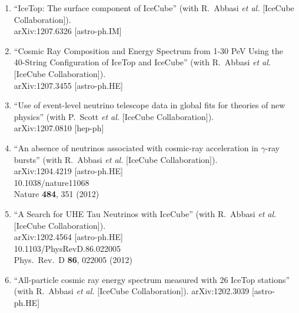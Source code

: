 \begin{enumerate}


\item ``IceTop: The surface component of IceCube'' (with R.~Abbasi {\it et
  al.}  [IceCube Collaboration]).  \\{}arXiv:1207.6326 [astro-ph.IM]
  


\item ``Cosmic Ray Composition and Energy Spectrum from 1-30 PeV Using the
  40-String Configuration of IceTop and IceCube'' (with R.~Abbasi {\it
    et al.}  [IceCube Collaboration]).  \\{}arXiv:1207.3455
  [astro-ph.HE]
  


\item ``Use of event-level neutrino telescope data in global fits for
  theories of new physics'' (with P.~Scott {\it et al.}  [IceCube
    Collaboration]).  \\{}arXiv:1207.0810 [hep-ph]
  


\item ``An absence of neutrinos associated with cosmic-ray acceleration in
  $\gamma$-ray bursts'' (with R.~Abbasi {\it et al.}  [IceCube
  Collaboration]).  \\{}arXiv:1204.4219 [astro-ph.HE]
  \\{}10.1038/nature11068 \\{}Nature {\bf 484}, 351 (2012) %


\item ``A Search for UHE Tau Neutrinos with IceCube'' (with R.~Abbasi {\it et
  al.}  [IceCube Collaboration]).  \\{}arXiv:1202.4564 [astro-ph.HE]
  \\{}10.1103/PhysRevD.86.022005 \\{}Phys.\ Rev.\ D {\bf 86}, 022005
  (2012) %


\item ``All-particle cosmic ray energy spectrum measured with 26 IceTop
  stations'' (with R.~Abbasi {\it et al.}  [IceCube Collaboration]). arXiv:1202.3039 [astro-ph.HE]
  

\end{enumerate}
